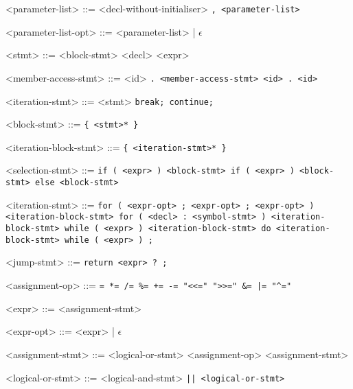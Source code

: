 \documentclass[leqno, 12pt]{article}
\begin{document}
\begin{grammar}
            <parameter-list> ::= <decl-without-initialiser> \tt{,} <parameter-list>

            <parameter-list-opt> ::= <parameter-list> | $\epsilon$

            <stmt> ::= <block-stmt>
            \alt <decl>
            \alt <expr>
            
            <member-access-stmt> ::= <id> \tt{.} <member-access-stmt>
            \alt <id> \tt{.} <id>

            <iteration-stmt> ::= <stmt>
            \alt \tt{break};
            \alt \tt{continue};
            
            <block-stmt> ::= \tt{\{} <stmt>* \tt{\}}
            
            <iteration-block-stmt> ::= \tt{\{} <iteration-stmt>* \tt{\}}

            <selection-stmt> ::= \tt{if} \tt{(} <expr> \tt{)} <block-stmt>
            \alt \tt{if} \tt{(} <expr> \tt{)} <block-stmt> \tt{else} <block-stmt>

            <iteration-stmt> ::= \tt{for} \tt{(} <expr-opt> \tt{;} <expr-opt> \tt{;} <expr-opt> \tt{)} <iteration-block-stmt>
            \alt \tt{for} \tt{(} <decl> \tt{:} <symbol-stmt> \tt{)} <iteration-block-stmt>
            \alt \tt{while} \tt{(} <expr> \tt{)} <iteration-block-stmt>
            \alt \tt{do} <iteration-block-stmt> \tt{while} \tt{(} <expr> \tt{)} \tt{;}

            <jump-stmt> ::= \tt{return} <expr> ? \tt{;}

            <assignment-op> ::= \tt{=}
            \alt \tt{*=}
            \alt \tt{/=}
            \alt \tt{\%=}
            \alt \tt{+=}
            \alt \tt{-=}
            \alt \tt{"<<="}
            \alt \tt{">>="}
            \alt \tt{\&=}
            \alt \tt{|=}
            \alt \tt{"^="}

            <expr> ::= <assignment-stmt>

            <expr-opt> ::= <expr> | $\epsilon$

            <assignment-stmt> ::= <logical-or-stmt>
             <assignment-op> <assignment-stmt>

            <logical-or-stmt> ::= <logical-and-stmt>
             \tt{||} <logical-or-stmt>


\end{grammar}
\end{document}
